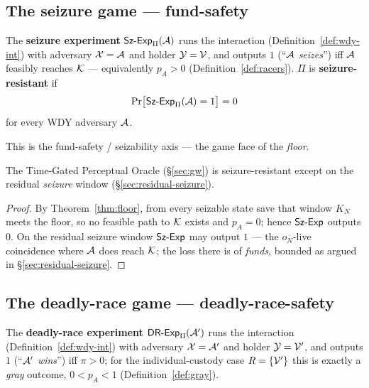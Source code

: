 \subsection{The seizure game --- fund-safety}

\begin{definition}\label{def:szexp}
The \textbf{seizure experiment} $\mathsf{Sz}\text{-}\mathsf{Exp}_{\Pi}(\mathcal{A})$ runs the interaction
(Definition~\ref{def:wdy-int}) with adversary $\mathcal{X} = \mathcal{A}$ and holder
$\mathcal{Y} = \mathcal{V}$, and outputs $1$ (``$\mathcal{A}$ \emph{seizes}'') iff
$\mathcal{A}$ feasibly reaches $\mathcal{K}$ --- equivalently $p_A > 0$
(Definition~\ref{def:racers}). $\Pi$ is \textbf{seizure-resistant} if
\[
  \Pr\!\big[\mathsf{Sz}\text{-}\mathsf{Exp}_{\Pi}(\mathcal{A}) = 1\big] = 0
\]
for every WDY adversary
$\mathcal{A}$.
\end{definition}

This is the fund-safety / seizability axis --- the game face of the \emph{floor}.

\begin{corollary}\label{cor:tgpo-szsecure}
The Time-Gated Perceptual Oracle (\S\ref{sec:gw}) is seizure-resistant except on the
residual \emph{seizure} window (\S\ref{sec:residual-seizure}).
\end{corollary}
\begin{proof}
By Theorem~\ref{thm:floor}, from every seizable state save that window $K_N$ meets
the floor, so no feasible path to $\mathcal{K}$ exists and $p_A = 0$; hence
$\mathsf{Sz}\text{-}\mathsf{Exp}$ outputs $0$. On the residual seizure window $\mathsf{Sz}\text{-}\mathsf{Exp}$ may output $1$ --- the
$o_N$-live coincidence where $\mathcal{A}$ does reach $\mathcal{K}$; the loss there is of
\emph{funds}, bounded as argued in \S\ref{sec:residual-seizure}.
\end{proof}

\subsection{The deadly-race game --- deadly-race-safety}

\begin{definition}\label{def:crexp}
The \textbf{deadly-race experiment} $\mathsf{DR}\text{-}\mathsf{Exp}_{\Pi}(\mathcal{A}')$ runs the interaction
(Definition~\ref{def:wdy-int}) with adversary $\mathcal{X} = \mathcal{A}'$ and holder
$\mathcal{Y} = \mathcal{V}'$, and outputs $1$ (``$\mathcal{A}'$ \emph{wins}'') iff
$\pi > 0$; for the individual-custody case $R = \{\mathcal{V}'\}$ this is exactly a
\emph{gray} outcome, $0 < p_A < 1$ (Definition~\ref{def:gray}).
\end{definition}

